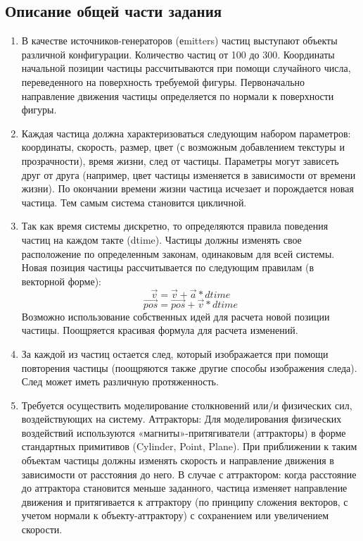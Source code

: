 \documentclass[a4paper,12pt]{article}
\begin{document}
\subsection{Описание общей части задания}

\begin{enumerate}
    \item  В качестве источников-генераторов (еmitters) частиц выступают объекты различной
          конфигурации. Количество частиц от 100 до 300. Координаты начальной позиции частицы
          рассчитываются при помощи случайного числа, переведенного на поверхность требуемой
          фигуры. Первоначально направление движения частицы определяется по нормали к
          поверхности фигуры.
    \item Каждая частица должна характеризоваться следующим набором параметров:
          координаты, скорость, размер, цвет (с возможным добавлением текстуры и прозрачности),
          время жизни, след от частицы. Параметры могут зависеть друг от друга (например, цвет
          частицы изменяется в зависимости от времени жизни). По окончании времени жизни
          частица исчезает и порождается новая частица. Тем самым система становится
          цикличной.
    \item Так как время системы дискретно, то определяются правила поведения частиц на
          каждом такте (dtime). Частицы должны изменять свое расположение по определенным
          законам, одинаковым для всей системы. Новая позиция частицы рассчитывается по
          следующим правилам (в векторной форме):
          \begin{equation}
              \vec{v} = \vec{v} + \vec{a} * dtime
          \end{equation}
          \begin{equation}
              \vec{pos} = \vec{pos} + \vec{v} * dtime
          \end{equation}
          Возможно использование собственных идей для расчета новой позиции частицы.
          Поощряется красивая формула для расчета изменений.
    \item За каждой из частиц остается след, который изображается при помощи повторения
          частицы (поощряются также другие способы изображения следа). След может иметь
          различную протяженность.
    \item Требуется осуществить моделирование столкновений или/и физических сил,
          воздействующих на систему.
          Аттракторы: Для моделирования физических воздействий используются
          «магниты»-притягиватели (аттракторы) в форме стандартных примитивов (Cylinder, Point,
          Plane). При приближении к таким объектам частицы должны изменять скорость и
          направление движения в зависимости от расстояния до него. В случае с аттрактором:
          когда расстояние до аттрактора становится меньше заданного, частица изменяет
          направление движения и притягивается к аттрактору (по принципу сложения векторов, с
          учетом нормали к объекту-аттрактору) с сохранением или увеличением скорости.
\end{enumerate}
\end{document}
